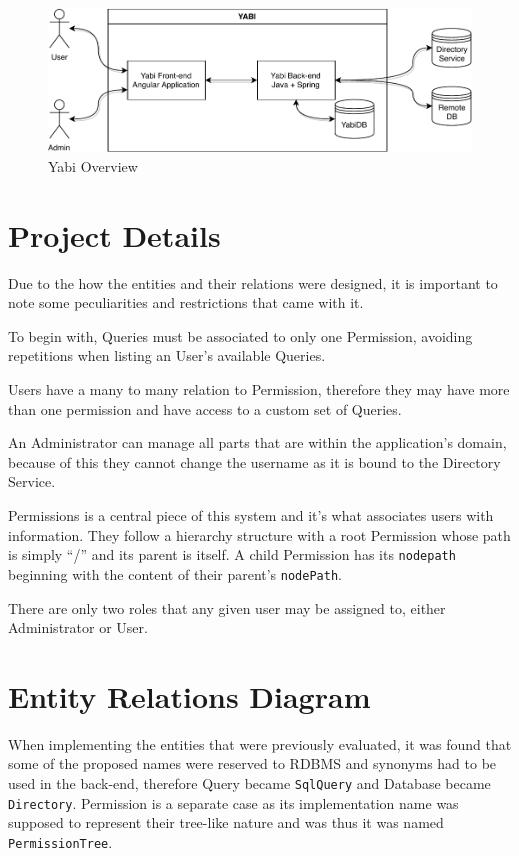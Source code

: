 \begin{figure}
  \centering
  \includegraphics[width=\textwidth]{images/diagramas/overview.pdf}
  \caption{Yabi Overview}\label{fig:overview}
\end{figure}

\section{Project Details}
Due to the how the entities and their relations were designed, it is important to note some peculiarities and restrictions that came with it.

To begin with, Queries must be associated to only one Permission, avoiding repetitions when listing an User's available Queries.

Users have a many to many relation to Permission, therefore they may have more than one permission and have access to a custom set of Queries.

An Administrator can manage all parts that are within the application's domain, because of this they cannot change the username as it is bound to the Directory Service.

Permissions is a central piece of this system and it's what associates users with information.
They follow a hierarchy structure with a root Permission whose path is simply ``/'' and its parent is itself.
A child Permission has its \texttt{nodepath} beginning with the content of their parent's \texttt{nodePath}.

There are only two roles that any given user may be assigned to, either Administrator or User.

\section{Entity Relations Diagram}\label{tities}
When implementing the entities that were previously evaluated, it was found that some of the proposed names were reserved to \gls{RDBMS} and synonyms had to be used in the back-end, therefore Query became \texttt{SqlQuery} and Database became \texttt{Directory}. Permission is a separate case as its implementation name was supposed to represent their tree-like nature and was thus it was named \texttt{PermissionTree}.

